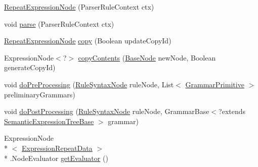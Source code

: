 \begin{DoxyCompactItemize}
\item 
\hyperlink{classit_1_1emarolab_1_1cagg_1_1core_1_1language_1_1syntax_1_1expressionTree_1_1expressionNodeType_1_1RepeatExpressionNode_a63faa87040ceb29fcee3bf4df80d6eae}{Repeat\-Expression\-Node} (Parser\-Rule\-Context ctx)
\item 
void \hyperlink{classit_1_1emarolab_1_1cagg_1_1core_1_1language_1_1syntax_1_1expressionTree_1_1expressionNodeType_1_1RepeatExpressionNode_a2b1a4143473dd1e2df138a825b5fcc26}{parse} (Parser\-Rule\-Context ctx)
\item 
\hyperlink{classit_1_1emarolab_1_1cagg_1_1core_1_1language_1_1syntax_1_1expressionTree_1_1expressionNodeType_1_1RepeatExpressionNode}{Repeat\-Expression\-Node} \hyperlink{classit_1_1emarolab_1_1cagg_1_1core_1_1language_1_1syntax_1_1expressionTree_1_1expressionNodeType_1_1RepeatExpressionNode_afac521e27f4717e532aaeb0f6287c190}{copy} (Boolean update\-Copy\-Id)
\item 
Expression\-Node$<$?$>$ \hyperlink{classit_1_1emarolab_1_1cagg_1_1core_1_1language_1_1syntax_1_1expressionTree_1_1expressionNodeType_1_1RepeatExpressionNode_aa586860f4298f566cda48996e31c2a41}{copy\-Contents} (\hyperlink{classit_1_1emarolab_1_1cagg_1_1core_1_1BaseNode}{Base\-Node} new\-Node, Boolean generate\-Copy\-Id)
\item 
void \hyperlink{classit_1_1emarolab_1_1cagg_1_1core_1_1language_1_1syntax_1_1expressionTree_1_1expressionNodeType_1_1RepeatExpressionNode_a792248ed845785e52801abd9be092531}{do\-Pre\-Processing} (\hyperlink{classit_1_1emarolab_1_1cagg_1_1core_1_1language_1_1syntax_1_1abstractTree_1_1syntaxNodeType_1_1RuleSyntaxNode}{Rule\-Syntax\-Node} rule\-Node, List$<$ \hyperlink{classit_1_1emarolab_1_1cagg_1_1core_1_1language_1_1syntax_1_1GrammarPrimitive}{Grammar\-Primitive} $>$ preliminary\-Grammars)
\item 
void \hyperlink{classit_1_1emarolab_1_1cagg_1_1core_1_1language_1_1syntax_1_1expressionTree_1_1expressionNodeType_1_1RepeatExpressionNode_a0e8595e50c466a559c4e4d5c4768ce7c}{do\-Post\-Processing} (\hyperlink{classit_1_1emarolab_1_1cagg_1_1core_1_1language_1_1syntax_1_1abstractTree_1_1syntaxNodeType_1_1RuleSyntaxNode}{Rule\-Syntax\-Node} rule\-Node, Grammar\-Base$<$?extends \hyperlink{interfaceit_1_1emarolab_1_1cagg_1_1core_1_1evaluation_1_1semanticGrammar_1_1syntaxCompiler_1_1SemanticExpressionTreeBase}{Semantic\-Expression\-Tree\-Base} $>$ grammar)
\item 
Expression\-Node\\*
$<$ \hyperlink{classit_1_1emarolab_1_1cagg_1_1core_1_1language_1_1syntax_1_1expressionTree_1_1ExpressionDataFactory_1_1ExpressionRepeatData}{Expression\-Repeat\-Data} $>$\\*
.Node\-Evaluator \hyperlink{classit_1_1emarolab_1_1cagg_1_1core_1_1language_1_1syntax_1_1expressionTree_1_1expressionNodeType_1_1RepeatExpressionNode_aa6cf0eb741b9f748290dee920af2d402}{get\-Evaluator} ()
\end{DoxyCompactItemize}
